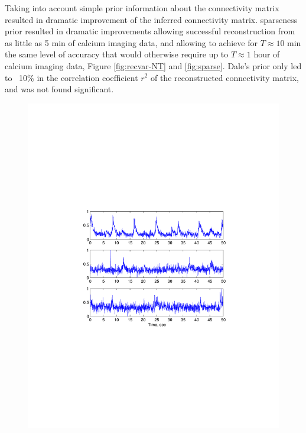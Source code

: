 Taking into account simple prior information about the connectivity matrix resulted in dramatic improvement of the inferred connectivity matrix. sparseness prior resulted in dramatic improvements allowing successful reconstruction from as little as 5 min of calcium imaging data, and allowing to achieve for $T\approx 10$ min the same level of accuracy that would otherwise require up to $T\approx 1$ hour of calcium imaging data, Figure \ref{fig:recvar-NT} and \ref{fig:sparse}. Dale's prior only led to ~10\% in the correlation coefficient $r^2$ of the reconstructed connectivity matrix, and was not found significant.

\begin{figure}[h]
\centering
\begin{minipage}[c]{0.45\hsize}
\includegraphics[width=\hsize]{../figs/FigureA11_real_traces}
\end{minipage}
\begin{minipage}[c]{0.45\hsize}

\end{minipage}
\end{figure}
